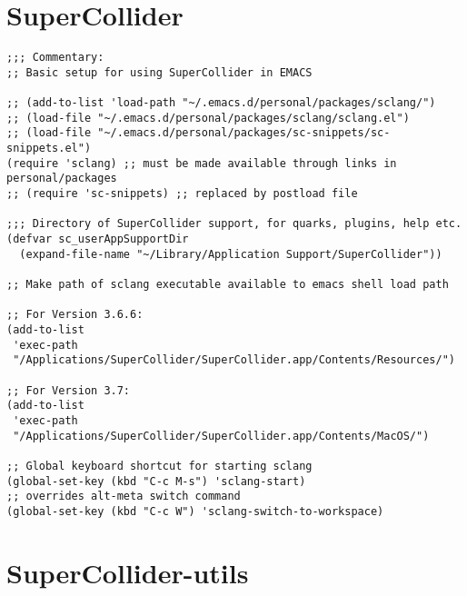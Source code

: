 \documentclass[11pt]{article}
\begin{document}
\section{SuperCollider}
\label{sec:orge50d9f8}

\begin{verbatim}
;;; Commentary:
;; Basic setup for using SuperCollider in EMACS

;; (add-to-list 'load-path "~/.emacs.d/personal/packages/sclang/")
;; (load-file "~/.emacs.d/personal/packages/sclang/sclang.el")
;; (load-file "~/.emacs.d/personal/packages/sc-snippets/sc-snippets.el")
(require 'sclang) ;; must be made available through links in personal/packages
;; (require 'sc-snippets) ;; replaced by postload file

;;; Directory of SuperCollider support, for quarks, plugins, help etc.
(defvar sc_userAppSupportDir
  (expand-file-name "~/Library/Application Support/SuperCollider"))

;; Make path of sclang executable available to emacs shell load path

;; For Version 3.6.6:
(add-to-list
 'exec-path
 "/Applications/SuperCollider/SuperCollider.app/Contents/Resources/")

;; For Version 3.7:
(add-to-list
 'exec-path
 "/Applications/SuperCollider/SuperCollider.app/Contents/MacOS/")

;; Global keyboard shortcut for starting sclang
(global-set-key (kbd "C-c M-s") 'sclang-start)
;; overrides alt-meta switch command
(global-set-key (kbd "C-c W") 'sclang-switch-to-workspace)

\end{verbatim}

\section{SuperCollider-utils}
\label{sec:orgc1b81d6}
\end{document}
